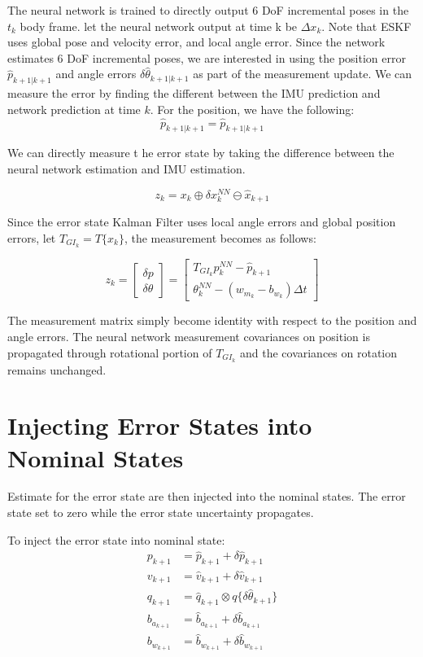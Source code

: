 \documentclass[]{article}
\begin{document}
The neural network is trained to directly output 6 DoF incremental poses in the $t_k$ body frame. let the neural network output at time k be $\Delta x_k$. Note that ESKF uses global pose and velocity error, and local angle error. Since the network estimates 6 DoF incremental poses, we are interested in using the position error $\hat{p}_{k+1|k+1}$ and angle errors $\delta \hat{\theta}_{k+1|k+1}$ as part of the measurement update. We can measure the error by finding the different between the IMU prediction and network prediction at time $k$. For the position, we have the following:
\[
\hat{p}_{k+1|k+1} = \hat{p}_{k+1|k+1}
\]


We can directly measure t he error state by taking the difference between the neural network estimation and IMU estimation.

\[z_k = x_{k} \oplus \delta x_k^{NN} \ominus \hat{x}_{k+1}\]

Since the error state Kalman Filter uses local angle errors and global position errors, let $T_{GI_k} = T\{x_k\}$, the measurement becomes as follows:


\[
z_k = 
\begin{bmatrix} \delta p \\ \delta \theta \end{bmatrix} = 
\begin{bmatrix} T_{GI_k} p_k^{NN} - \hat{p}_{k+1} \\ \theta_k^{NN} - (w_{m_k} - b_{w_k}) \Delta t  \end{bmatrix}
\]

The measurement matrix simply become identity with respect to the position and angle errors. The neural network measurement covariances on position is propagated through rotational portion of $T_{GI_k}$ and the covariances on rotation remains unchanged.

\section{Injecting Error States into Nominal States}
Estimate for the error state are then injected into the nominal states. The error state set to zero while the error state uncertainty propagates.

To inject the error state into nominal state:
\begin{align}
{p}_{k+1} &= \hat{p}_{k+1} + \delta \hat{p}_{k+1}\\
{v}_{k+1} &= \hat{v}_{k+1} + \delta \hat{v}_{k+1}\\
{q}_{k+1} &= \hat{q}_{k+1} \otimes q\{\delta \hat{\theta}_{k+1}\}\\
{b}_{a_{k+1}} &= \hat{b}_{a_{k+1}} + \delta \hat{b}_{a_{k+1}}\\
{b}_{w_{k+1}} &= \hat{b}_{w_{k+1}} + \delta \hat{b}_{w_{k+1}}
\end{align}
\end{document}
